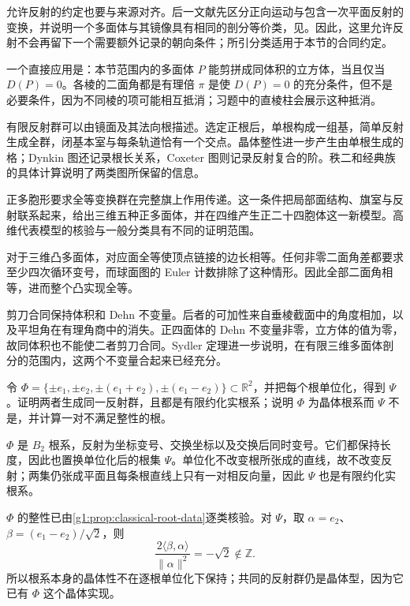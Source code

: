 \ProseParagraphBreak

允许反射的约定也要与来源对齐。后一文献先区分正向运动与包含一次平面反射的变换，并说明一个多面体与其镜像具有相同的剖分等价类，见\cite[第2节，第241--242页]{Jessen1968DehnSydler}。因此，这里允许反射不会再留下一个需要额外记录的朝向条件；所引分类适用于本节的合同约定。

\ProseParagraphBreak

一个直接应用是：本节范围内的多面体 \(P\) 能剪拼成同体积的立方体，当且仅当 \(D(P)=0\)。各棱的二面角都是有理倍 \(\pi\) 是使 \(D(P)=0\) 的充分条件，但不是必要条件，因为不同棱的项可能相互抵消；习题中的直棱柱会展示这种抵消。

\begin{chaptersummary}
	有限反射群可以由镜面及其法向根描述。选定正根后，单根构成一组基，简单反射生成全群，闭基本室与每条轨道恰有一个交点。晶体整性进一步产生由单根生成的格；Dynkin 图还记录根长关系，Coxeter 图则记录反射复合的阶。秩二和经典族的具体计算说明了两类图所保留的信息。

	正多胞形要求全等变换群在完整旗上作用传递。这一条件把局部面结构、旗室与反射联系起来，给出三维五种正多面体，并在四维产生正二十四胞体这一新模型。高维代表模型的核验与一般分类具有不同的证明范围。

	对于三维凸多面体，对应面全等使顶点链接的边长相等。任何非零二面角差都要求至少四次循环变号，而球面图的 Euler 计数排除了这种情形。因此全部二面角相等，进而整个凸实现全等。

	剪刀合同保持体积和 Dehn 不变量。后者的可加性来自垂棱截面中的角度相加，以及平坦角在有理角商中的消失。正四面体的 Dehn 不变量非零，立方体的值为零，故同体积也不能使二者剪刀合同。Sydler 定理进一步说明，在有限三维多面体剖分的范围内，这两个不变量合起来已经充分。
\end{chaptersummary}

\BookExercises

\begin{exercise}\label{g1:ex:unit-normal-crystallographic}
	令 \(\Phi=\{\pm e_1,\pm e_2,\pm(e_1+e_2),\pm(e_1-e_2)\}\subset\mathbb R^2\)，并把每个根单位化，得到 \(\Psi\)。证明两者生成同一反射群，且都是有限约化实根系；说明 \(\Phi\) 为晶体根系而 \(\Psi\) 不是，并计算一对不满足整性的根。
\end{exercise}
\begin{solution}
	\(\Phi\) 是 \(B_2\) 根系，反射为坐标变号、交换坐标以及交换后同时变号。它们都保持长度，因此也置换单位化后的根集 \(\Psi\)。单位化不改变根所张成的直线，故不改变反射；两集仍张成平面且每条根直线上只有一对相反向量，因此 \(\Psi\) 也是有限约化实根系。

	\(\Phi\) 的整性已由\cref{g1:prop:classical-root-data}逐类核验。对 \(\Psi\)，取 \(\alpha=e_2\)、\(\beta=(e_1-e_2)/\sqrt2\)，则
	\[
		\frac{2\langle\beta,\alpha\rangle}{\lVert\alpha\rVert^2}=-\sqrt2\notin\mathbb Z.
	\]
	所以根系本身的晶体性不在逐根单位化下保持；共同的反射群仍是晶体型，因为它已有 \(\Phi\) 这个晶体实现。
\end{solution}


